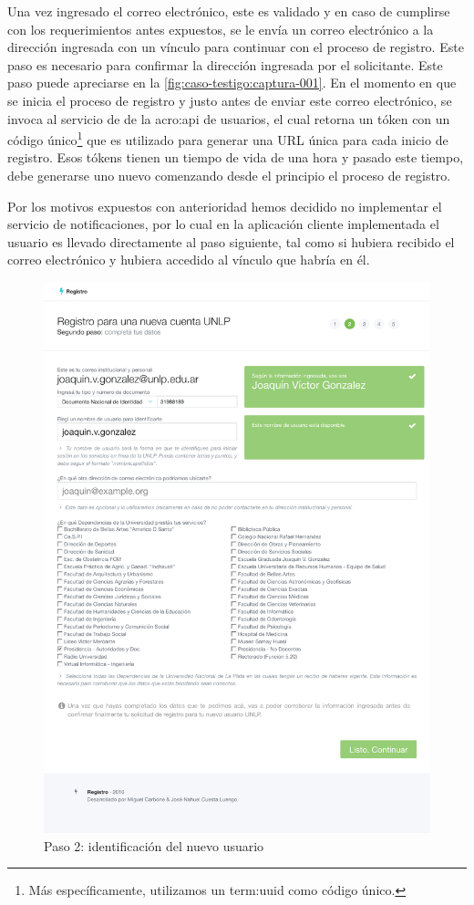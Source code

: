 Una vez ingresado el correo electrónico, este es validado y en caso de cumplirse con los requerimientos antes expuestos, se le envía un correo electrónico a la dirección ingresada con un vínculo para continuar con el proceso de registro. Este paso es necesario para confirmar la dirección ingresada por el solicitante. Este paso puede apreciarse en la \autoref{fig:caso-testigo:captura-001}. En el momento en que se inicia el proceso de registro y justo antes de enviar este correo electrónico, se invoca al servicio de  de la \gls{acro:api} de usuarios, el cual retorna un tóken con un código único\footnote{Más específicamente, utilizamos un \gls{term:uuid} como código único.} que es utilizado para generar una URL única para cada inicio de registro. Esos tókens tienen un tiempo de vida de una hora y pasado este tiempo, debe generarse uno nuevo comenzando desde el principio el proceso de registro.

Por los motivos expuestos con anterioridad hemos decidido no implementar el servicio de notificaciones, por lo cual en la aplicación cliente implementada el usuario es llevado directamente al paso siguiente, tal como si hubiera recibido el correo electrónico y hubiera accedido al vínculo que habría en él.

\begin{figure}
  \centering
  \includegraphics[width=\textwidth,keepaspectratio]{src/images/05-capitulo-5/capturas/page_002.png}
  \caption{Paso 2: identificación del nuevo usuario}
  \label{fig:caso-testigo:captura-002}
\end{figure}

